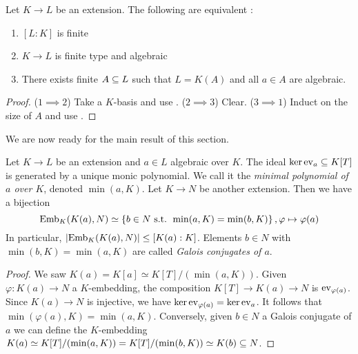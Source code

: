 \documentclass{article}
\begin{document}
\begin{prop}
  
  Let $K \to L$ be an extension.
  The following are equivalent : 
  \begin{enumerate}
    \item $[L : K]$ is finite
    \item $K \to L$ is finite type and algebraic 
    \item There exists finite $A \subseteq L$ such that $L = K(A)$ and
    all $a \in A$ are algebraic.
  \end{enumerate}
\end{prop}
\begin{proof}
  ($1 \implies 2$) Take a $K$-basis and use .
  ($2 \implies 3$) Clear.
  ($3 \implies 1$)
  Induct on the size of $A$ and use 
  .

\end{proof}

We are now ready for the main result of this section.

\begin{prop}
  
  Let $K \to L$ be an extension and $a \in L$ algebraic over $K$.
  The ideal $\ker \operatorname{ev}_a \subseteq K[T]$ is generated by a unique
  monic polynomial.
  We call it the \emph{minimal polynomial of $a$ over $K$},
  denoted $\min(a , K)$.
  Let $K \to N$ be another extension.
  Then we have a bijection \[
    \mathrm{Emb}_K(K(a) , N) \simeq \left\{b \in N \text{ s.t. } \min(a , K) = \min(b , K)\right\},
    \varphi \mapsto \varphi(a)
  \]
  In particular, $\left\vert \mathrm{Emb}_K(K(a) , N) \right\vert \leq [K(a) : K]$.
  Elements $b \in N$ with $\min(b , K) = \min(a , K)$ are called 
  \emph{Galois conjugates of $a$}.

\end{prop}
\begin{proof}
  We saw $K(a) = K[a] \simeq K[T]/(\min(a , K))$.
  Given $\varphi : K(a) \to N$ a $K$-embedding,
  the composition $K[T] \to K(a) \to N$ is $\operatorname{ev}_{\varphi(a)}$.
  Since $K(a) \to N$ is injective, we have $\ker \operatorname{ev}_{\varphi(a)} = \ker \operatorname{ev}_a$.
  It follows that $\min(\varphi(a) , K) = \min(a , K)$.
  Conversely, given $b \in N$ a Galois conjugate of $a$ we can define the
  $K$-embedding $K(a) \simeq K[T] / (\min(a , K)) = K[T] / (\min(b , K))
  \simeq K(b) \subseteq N$.
\end{proof}
\end{document}
